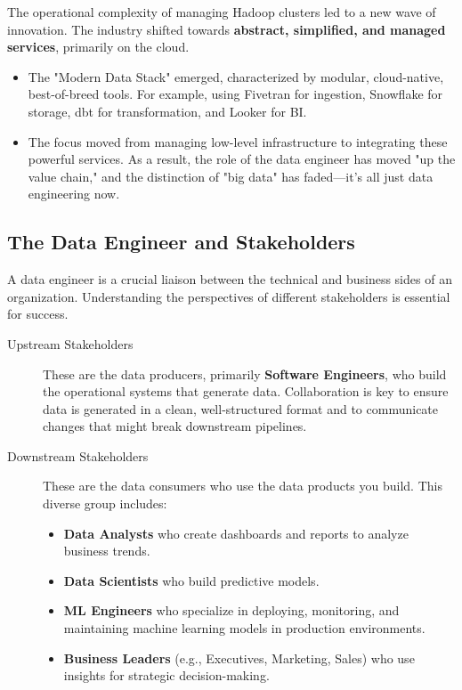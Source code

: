 \documentclass{article}
\begin{document}
\begin{description}
\begin{itemize}
    \end{itemize}
    \item[The 2010s-Present: The Modern Data Stack] The operational complexity of managing Hadoop clusters led to a new wave of innovation. The industry shifted towards \textbf{abstract, simplified, and managed services}, primarily on the cloud.
    \begin{itemize}
        \item The "Modern Data Stack" emerged, characterized by modular, cloud-native, best-of-breed tools. For example, using Fivetran for ingestion, Snowflake for storage, dbt for transformation, and Looker for BI.
        \item The focus moved from managing low-level infrastructure to integrating these powerful services. As a result, the role of the data engineer has moved "up the value chain," and the distinction of "big data" has faded—it's all just data engineering now.
    \end{itemize}
\end{description}

\subsection{The Data Engineer and Stakeholders}
A data engineer is a crucial liaison between the technical and business sides of an organization. Understanding the perspectives of different stakeholders is essential for success.
\begin{description}
    \item[Upstream Stakeholders] These are the data producers, primarily \textbf{Software Engineers}, who build the operational systems that generate data. Collaboration is key to ensure data is generated in a clean, well-structured format and to communicate changes that might break downstream pipelines.
    \item[Downstream Stakeholders] These are the data consumers who use the data products you build. This diverse group includes:
    \begin{itemize}
        \item \textbf{Data Analysts} who create dashboards and reports to analyze business trends.
        \item \textbf{Data Scientists} who build predictive models.
        \item \textbf{ML Engineers} who specialize in deploying, monitoring, and maintaining machine learning models in production environments.
        \item \textbf{Business Leaders} (e.g., Executives, Marketing, Sales) who use insights for strategic decision-making.
    \end{itemize}
\end{description}
\end{document}
